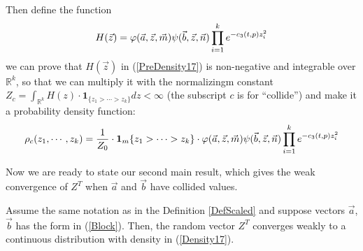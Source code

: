 Then define the function 
\begin{align}{\label{PreDensity17}}
	H(\vec{z})=\varphi(\vec{a},\vec{z},\vec{m})\psi(\vec{b},\vec{z},\vec{n})\prod_{i=1}^{k}e^{-c_{3}(t,p)z_{i}^{2}}
\end{align}
we can prove that $H(\vec{z})$ in (\ref{PreDensity17}) is non-negative and integrable over $\mathbb{R}^{k}$, so that we can multiply it with the normalizingm constant $Z_{c}=\int_{\mathbb{R}^{k}}H(z)\cdot\mathbf{1}_{\{z_1>\cdots>z_{k}\}}dz<\infty$ (the subscript $c$ is for ``collide'') and make it a probability density function:
\begin{align}{\label{Density17}}
\rho_{c}(z_{1},\cdots,z_{k})=\frac{1}{Z_{0}}\cdot\mathbf{1}_m{\{z_{1}>\cdots> z_{k}\}}\cdot \varphi(\vec{a},\vec{z},\vec{m})\psi(\vec{b},\vec{z},\vec{n})\prod_{i=1}^{k}e^{-c_{3}(t,p)z_{i}^{2}}	
\end{align}

Now we are ready to state our second main result, which gives the weak convergence of $Z^{T}$ when $\vec{a}$ and $\vec{b}$ have collided values.
\begin{proposition}{\label{WeakConvCollide}}
Assume the same notation as in the Definition \ref{DefScaled} and suppose vectors $\vec{a}$, $\vec{b}$ has the form in (\ref{Block}). Then, the random vector $Z^{T}$ converges weakly to a continuous distribution with density in (\ref{Density17}).
\end{proposition}

